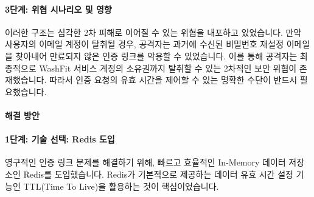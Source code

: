 \documentclass[12pt,a4paper]{article}
\begin{document}
    \vspace{1em}


    \paragraph{3단계: 위협 시나리오 및 영향} \par
    이러한 구조는 심각한 2차 피해로 이어질 수 있는 위협을 내포하고 있었습니다. 만약 사용자의 이메일 계정이 탈취될 경우, 공격자는 과거에 수신된 비밀번호 재설정 이메일을 찾아내어 만료되지 않은 인증 링크를 악용할 수 있었습니다. 이를 통해 공격자는 최종적으로 WashFit 서비스 계정의 소유권까지 탈취할 수 있는 2차적인 보안 위협이 존재했습니다. 따라서 인증 요청의 유효 시간을 제어할 수 있는 명확한 수단이 반드시 필요했습니다.\\




    \paragraph{해결 방안}



    \paragraph{1단계: 기술 선택: Redis 도입} \par
    영구적인 인증 링크 문제를 해결하기 위해, 빠르고 효율적인 In-Memory 데이터 저장소인 Redis를 도입했습니다. Redis가 기본적으로 제공하는 데이터 유효 시간 설정 기능인 TTL(Time To Live)을 활용하는 것이 핵심이었습니다.\\

    \vspace{1em}

\end{document}
